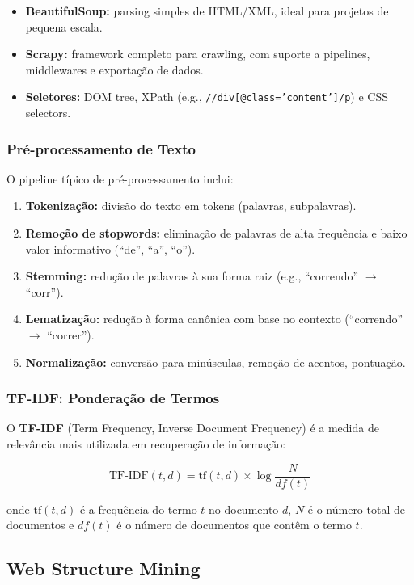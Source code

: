 \documentclass[12pt,a4paper]{article}
\begin{document}
\begin{itemize}
  \item \textbf{BeautifulSoup:} parsing simples de HTML/XML, ideal para projetos de pequena escala.
  \item \textbf{Scrapy:} framework completo para crawling, com suporte a pipelines, middlewares e exportação de dados.
  \item \textbf{Seletores:} DOM tree, XPath (e.g., \texttt{//div[@class='content']/p}) e CSS selectors.
\end{itemize}

\subsubsection{Pré-processamento de Texto}

O pipeline típico de pré-processamento inclui:
\begin{enumerate}
  \item \textbf{Tokenização:} divisão do texto em tokens (palavras, subpalavras).
  \item \textbf{Remoção de stopwords:} eliminação de palavras de alta frequência e baixo valor informativo (``de'', ``a'', ``o'').
  \item \textbf{Stemming:} redução de palavras à sua forma raiz (e.g., ``correndo'' $\to$ ``corr'').
  \item \textbf{Lematização:} redução à forma canônica com base no contexto (``correndo'' $\to$ ``correr'').
  \item \textbf{Normalização:} conversão para minúsculas, remoção de acentos, pontuação.
\end{enumerate}

\subsubsection{TF-IDF: Ponderação de Termos}

O \textbf{TF-IDF} (Term Frequency, Inverse Document Frequency) é a medida de relevância mais utilizada em recuperação de informação:

\begin{equation}
  \text{TF-IDF}(t, d) = \text{tf}(t, d) \times \log\frac{N}{df(t)}
\end{equation}

onde $\text{tf}(t,d)$ é a frequência do termo $t$ no documento $d$, $N$ é o número total de documentos e $df(t)$ é o número de documentos que contêm o termo $t$.

\subsection{Web Structure Mining}
\end{document}
